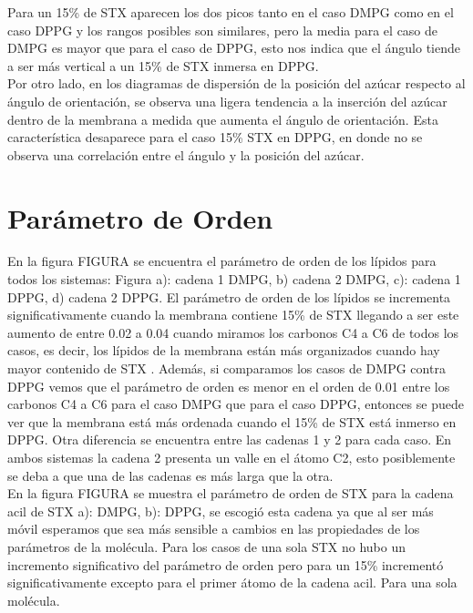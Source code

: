 Para un 15\% de STX aparecen los dos picos tanto en el caso DMPG como en el caso DPPG y los rangos posibles son similares, pero la media para el caso de DMPG es mayor que para el caso de DPPG, esto nos indica que el \'{a}ngulo tiende a ser m\'{a}s vertical a un 15\% de STX inmersa en DPPG.\\ 

Por otro lado, en los diagramas de dispersi\'{o}n de la posici\'{o}n del az\'{u}car respecto al \'{a}ngulo de orientaci\'{o}n, se observa una ligera tendencia a la inserci\'{o}n del az\'{u}car dentro de la membrana a medida que aumenta el \'{a}ngulo de orientaci\'{o}n. Esta caracter\'{i}stica desaparece para el caso 15\% STX en DPPG, en donde no se observa una correlaci\'{o}n entre el \'{a}ngulo y la posici\'{o}n del az\'{u}car.\\
\section{Par\'{a}metro de Orden}
En la figura FIGURA se encuentra el par\'{a}metro de orden de los l\'{i}pidos para todos los sistemas: Figura a): cadena 1 DMPG, b) cadena 2 DMPG, c): cadena 1 DPPG, d) cadena 2 DPPG. El par\'{a}metro de orden de los l\'{i}pidos se incrementa significativamente  cuando la membrana contiene 15\% de STX llegando a ser este aumento de entre 0.02 a 0.04 cuando miramos los carbonos C4 a C6 de todos los casos, es decir, los l\'{i}pidos de la membrana est\'{a}n m\'{a}s organizados cuando hay mayor contenido de STX . Adem\'{a}s, si comparamos los casos de DMPG contra DPPG vemos que el par\'{a}metro de orden es menor en el orden de 0.01 entre los carbonos C4 a C6 para el caso DMPG que para el caso DPPG, entonces se puede ver que la membrana est\'{a} m\'{a}s ordenada cuando el 15\% de STX est\'{a} inmerso en DPPG. Otra diferencia se encuentra entre las cadenas 1 y 2 para cada caso. En ambos sistemas la cadena 2 presenta un valle en el \'{a}tomo C2, esto posiblemente se deba a que una de las cadenas es m\'{a}s larga que la otra.\\

En la figura FIGURA se muestra el par\'{a}metro de orden de STX para la cadena acil de STX a): DMPG, b): DPPG, se escogi\'{o} esta cadena ya que al ser m\'{a}s m\'{o}vil esperamos que sea m\'{a}s sensible a cambios en las propiedades de los par\'{a}metros de la mol\'{e}cula. Para los casos de una sola STX no hubo un incremento significativo del par\'{a}metro de orden pero para un 15\% increment\'{o} significativamente excepto para el primer \'{a}tomo de la cadena acil. Para una sola mol\'{e}cula.
